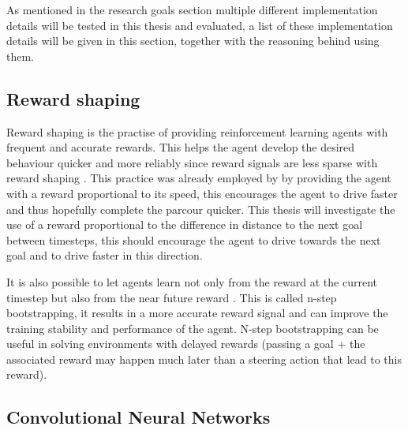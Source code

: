 As mentioned in the research goals section multiple different implementation details will be tested in this thesis and evaluated, a list of these implementation details will be given in this section, together with the reasoning behind using them.

\subsection{Reward shaping}

Reward shaping is the practise of providing reinforcement learning agents with frequent and accurate rewards. This helps the agent develop the desired behaviour quicker and more reliably since reward signals are less sparse with reward shaping \autocite{drl_for_ad}. This practice was already employed by \autocite{maximilian} by providing the agent with a reward proportional to its speed, this encourages the agent to drive faster and thus hopefully complete the parcour quicker. This thesis will investigate the use of a reward proportional to the difference in distance to the next goal between timesteps, this should encourage the agent to drive towards the next goal and to drive faster in this direction.

It is also possible to let agents learn not only from the reward at the current timestep but also from the near future reward \autocite{nstepbootstrapping}. This is called n-step bootstrapping, it results in a more accurate reward signal and can improve the training stability and performance of the agent. N-step bootstrapping can be useful in solving environments with delayed rewards (passing a goal + the associated reward may happen much later than a steering action that lead to this reward).


\subsection{Convolutional Neural Networks}

